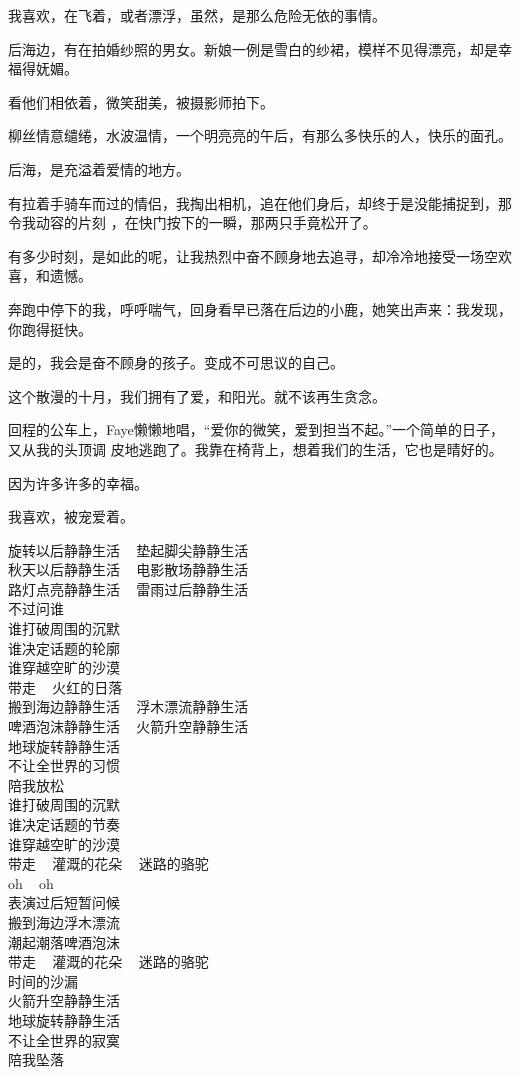 \documentclass[12pt,a4paper]{article}
\begin{document}
		我喜欢，在飞着，或者漂浮，虽然，是那么危险无依的事情。


		后海边，有在拍婚纱照的男女。新娘一例是雪白的纱裙，模样不见得漂亮，却是幸福得妩媚。

		看他们相依着，微笑甜美，被摄影师拍下。

		柳丝情意缱绻，水波温情，一个明亮亮的午后，有那么多快乐的人，快乐的面孔。

		后海，是充溢着爱情的地方。

		有拉着手骑车而过的情侣，我掏出相机，追在他们身后，却终于是没能捕捉到，那令我动容的片刻
	，在快门按下的一瞬，那两只手竟松开了。

		有多少时刻，是如此的呢，让我热烈中奋不顾身地去追寻，却冷冷地接受一场空欢喜，和遗憾。

		奔跑中停下的我，呼呼喘气，回身看早已落在后边的小鹿，她笑出声来：我发现，你跑得挺快。

		是的，我会是奋不顾身的孩子。变成不可思议的自己。


		这个散漫的十月，我们拥有了爱，和阳光。就不该再生贪念。

		回程的公车上，Faye懒懒地唱，“爱你的微笑，爱到担当不起。”一个简单的日子，又从我的头顶调
	皮地逃跑了。我靠在椅背上，想着我们的生活，它也是晴好的。


		因为许多许多的幸福。

		我喜欢，被宠爱着。

	\endwriting



		\indentenv{4\ccwd}{4\ccwd}{\centering}
		旋转以后静静生活 ~ 垫起脚尖静静生活 \\
		秋天以后静静生活 ~ 电影散场静静生活 \\
		路灯点亮静静生活 ~ 雷雨过后静静生活 \\
		不过问谁 \\
		谁打破周围的沉默 \\
		谁决定话题的轮廓 \\
		谁穿越空旷的沙漠 \\
		带走 ~ 火红的日落 \\
		搬到海边静静生活 ~ 浮木漂流静静生活 \\
		啤酒泡沫静静生活 ~ 火箭升空静静生活 \\
		地球旋转静静生活 \\
		不让全世界的习惯 \\
		陪我放松 \\
		谁打破周围的沉默 \\
		谁决定话题的节奏 \\
		谁穿越空旷的沙漠 \\
		带走 ~ 灌溉的花朵 ~ 迷路的骆驼 \\
		oh ~ oh \\
		表演过后短暂问候 \\
		搬到海边浮木漂流 \\
		潮起潮落啤酒泡沫 \\
		带走 ~ 灌溉的花朵 ~ 迷路的骆驼 \\
		时间的沙漏 \\
		火箭升空静静生活 \\
		地球旋转静静生活 \\
		不让全世界的寂寞 \\
		陪我坠落
		\endindentenv
\end{document}
